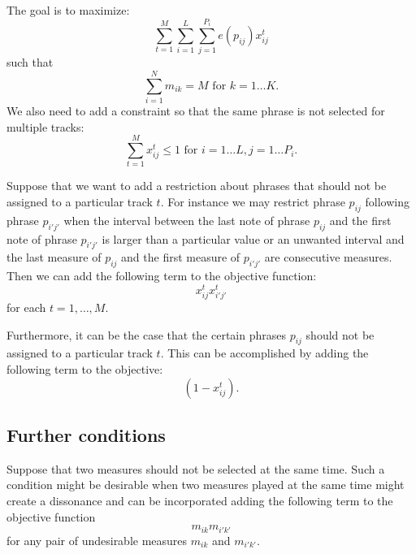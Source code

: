 \documentclass[11pt,a4paper]{article}
\begin{document}
 The goal is to maximize:
 \begin{equation}
 \sum_{t=1}^M \sum_{i=1}^L\sum_{j=1}^{P_i} e(p_{ij})x_{ij}^t
 \end{equation}
 such that
 \begin{equation}
 \sum_{i=1}^N m_{ik} = M \mbox{ for }k=1\dots K. 
 \end{equation} 
 We also need to add a constraint so that the same phrase is not selected for multiple tracks:
  \begin{equation}
 \sum_{t=1}^M x_{ij}^t \leq 1 \mbox{ for }i=1\dots L, j=1 \dots P_i. 
 \end{equation}
 
 Suppose that we want to add a restriction about phrases that should not be assigned to a particular track $ t $. For instance we may restrict phrase $ p_{ij} $ following phrase $ p_{i'j'} $ when the interval between the last note of phrase $ p_{ij} $ and the first note of phrase $p_{i'j'} $ is larger than a particular value or an unwanted interval and the last measure of $ p_{ij} $ and the first measure of $ p_{i'j'} $ are consecutive measures. Then we can add the following term to the objective function:
 \begin{equation}
 x_{ij}^tx_{i'j'}^t
 \end{equation} 
 for each $ t=1,\dots,M $.
 
 Furthermore, it can be the case that the certain phrases $ p_{ij} $ should not be assigned to a particular track $ t $. This can be accomplished by adding the following term to the objective:
 \begin{equation}
 (1-x_{ij}^t).
 \end{equation} 
 
 \subsection{Further conditions}
 Suppose that two measures should not be selected at the same time. Such a condition might be desirable when two measures played at the same time might create a dissonance and can be incorporated adding the following term to the objective function
 \begin{equation}
 m_{ik}m_{i'k'}
 \end{equation}  
for any pair of undesirable measures $m_{ik}$ and $ m_{i'k'} $. 



\end{document}
